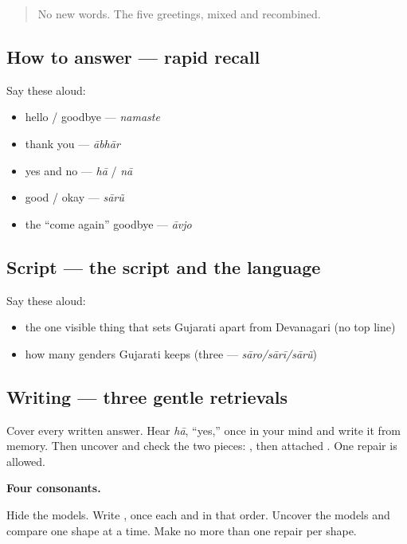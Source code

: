\label{lesson:GU-C01-practice}



\begin{quote}
No new words. The five greetings, mixed and recombined.
\end{quote}

\subsection*{How to answer — rapid recall}
Say these aloud:

\begin{itemize}
\raggedright
  \item hello / goodbye — \emph{namaste}
  \item thank you — \emph{ābhār}
  \item yes and no — \emph{hā} / \emph{nā}
  \item good / okay — \emph{sārũ}
  \item the \textquotedblleft{}come again\textquotedblright{} goodbye — \emph{āvjo}
\end{itemize}

\subsection*{Script — the script and the language}
Say these aloud:

\begin{itemize}
\raggedright
  \item the one visible thing that sets Gujarati apart from Devanagari (no top line)
  \item how many genders Gujarati keeps (three — \emph{sāro/sārī/sārũ})
\end{itemize}

\subsection*{Writing — three gentle retrievals}
Cover every written answer. Hear \emph{hā}, \textquotedblleft{}yes,\textquotedblright{} once in your mind and write it from memory. Then uncover \textbf{} and check the two pieces: \textbf{}, then attached \textbf{}. One repair is allowed.

\textbf{Four consonants.}

Hide the models. Write \textbf{   }, once each and in that order. Uncover the models and compare one shape at a time. Make no more than one repair per shape.

